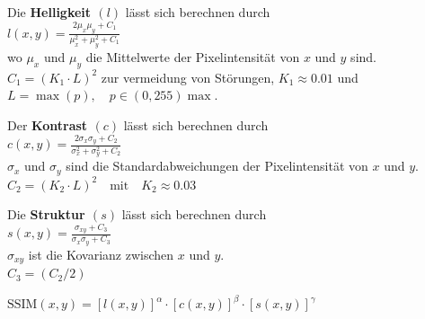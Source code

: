             \begin{center}    
                Die \textbf{Helligkeit $(l)$} \vspace{1mm} lässt sich berechnen durch \\
                $l(x, y) = \frac{2 \mu_x \mu_y + C_1}{\mu_x^2 + \mu_y^2 + C_1}$ \vspace{1mm}\\
                wo $\mu_x$ und $\mu_y$ die Mittelwerte der Pixelintensität von $x$ und $y$ sind.\\
                $C_1 = (K_1 \cdot L)^2$ zur vermeidung von Störungen, $K_1 \approx 0.01$ und
                $L = \max(p), \quad p \in (0, 255) \max$.\\
            \end{center}
            \begin{center}    
                Der \textbf{Kontrast $(c)$} \vspace{1mm} lässt sich berechnen durch \\
                $c(x, y) = \frac{2 \sigma_x \sigma_y + C_2}{\sigma_x^2 + \sigma_y^2 + C_2}$ \vspace{1mm}\\
                $\sigma_x$ und $\sigma_y$ sind die Standardabweichungen der Pixelintensität von $x$ und $y$.\\
                $C_2 = (K_2 \cdot L)^2 \quad \text{mit} \quad K_2 \approx 0.03$
            \end{center}
            \begin{center}    
                Die \textbf{Struktur  $(s)$} \vspace{1mm} lässt sich berechnen durch \\
                $s(x, y) = \frac{\sigma_{xy} + C_3}{\sigma_x \sigma_y + C_3}$ \vspace{1mm}\\
                $\sigma_{xy}$ ist die Kovarianz zwischen $x$ und $y$.\\
                $C_3 = (C_2 / 2)$
            \end{center}
            
            \begin{center}    
                $\text{SSIM}(x, y) = [l(x, y)]^\alpha \cdot [c(x, y)]^\beta \cdot [s(x, y)]^\gamma$
            \end{center}
       
